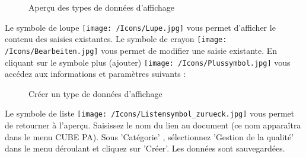 \begin{figure}[H]
\caption{Aperçu des types de données d'affichage}
\end{figure}

Le symbole de loupe \texttt{[image: /Icons/Lupe.jpg]}  vous permet d'afficher le contenu des saisies existantes. Le symbole de crayon \texttt{[image: /Icons/Bearbeiten.jpg]}  vous permet de modifier une saisie existante. En cliquant sur le symbole plus (ajouter) \texttt{[image: /Icons/Plussymbol.jpg]}  vous accédez aux informations et paramètres suivants :

\begin{figure}[H]
\caption{Créer un type de données d'affichage}
\end{figure}

Le symbole de liste \texttt{[image: /Icons/Listensymbol\_zurueck.jpg]}  vous permet de retourner à l'aperçu. Saisissez le nom du lien au document  (ce nom apparaîtra dans le menu CUBE PA). Sous 'Catégorie' , sélectionnez 'Gestion de la qualité' dans le menu déroulant et cliquez sur 'Créer'. Les données sont sauvegardées.

\vspace{\baselineskip}


